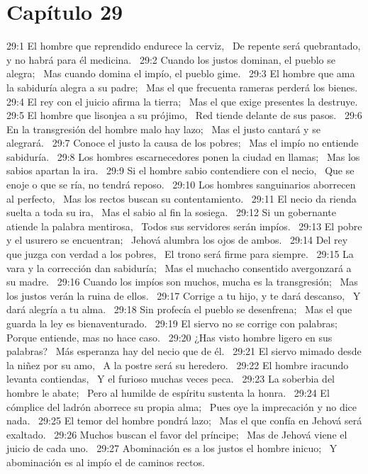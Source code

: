 \section*{Capítulo 29 }

29:1 El hombre que reprendido endurece la cerviz,  
De repente será quebrantado, y no habrá para él medicina.  
29:2 Cuando los justos dominan, el pueblo se alegra;  
Mas cuando domina el impío, el pueblo gime.  
29:3 El hombre que ama la sabiduría alegra a su padre;  
Mas el que frecuenta rameras perderá los bienes.  
29:4 El rey con el juicio afirma la tierra;  
Mas el que exige presentes la destruye.  
29:5 El hombre que lisonjea a su prójimo,  
Red tiende delante de sus pasos.  
29:6 En la transgresión del hombre malo hay lazo;  
Mas el justo cantará y se alegrará.  
29:7 Conoce el justo la causa de los pobres;  
Mas el impío no entiende sabiduría.  
29:8 Los hombres escarnecedores ponen la ciudad en llamas;  
Mas los sabios apartan la ira.  
29:9 Si el hombre sabio contendiere con el necio,  
Que se enoje o que se ría, no tendrá reposo.  
29:10 Los hombres sanguinarios aborrecen al perfecto,  
Mas los rectos buscan su contentamiento.  
29:11 El necio da rienda suelta a toda su ira,  
Mas el sabio al fin la sosiega.  
29:12 Si un gobernante atiende la palabra mentirosa,  
Todos sus servidores serán impíos.  
29:13 El pobre y el usurero se encuentran;  
Jehová alumbra los ojos de ambos.  
29:14 Del rey que juzga con verdad a los pobres,  
El trono será firme para siempre.  
29:15 La vara y la corrección dan sabiduría;  
Mas el muchacho consentido avergonzará a su madre.  
29:16 Cuando los impíos son muchos, mucha es la transgresión;  
Mas los justos verán la ruina de ellos.  
29:17 Corrige a tu hijo, y te dará descanso,  
Y dará alegría a tu alma.  
29:18 Sin profecía el pueblo se desenfrena;  
Mas el que guarda la ley es bienaventurado.  
29:19 El siervo no se corrige con palabras;  
Porque entiende, mas no hace caso.  
29:20 ¿Has visto hombre ligero en sus palabras?  
Más esperanza hay del necio que de él.  
29:21 El siervo mimado desde la niñez por su amo,  
A la postre será su heredero.  
29:22 El hombre iracundo levanta contiendas,  
Y el furioso muchas veces peca.  
29:23 La soberbia del hombre le abate;  
Pero al humilde de espíritu sustenta la honra.  
29:24 El cómplice del ladrón aborrece su propia alma;  
Pues oye la imprecación y no dice nada.  
29:25 El temor del hombre pondrá lazo;  
Mas el que confía en Jehová será exaltado.  
29:26 Muchos buscan el favor del príncipe;  
Mas de Jehová viene el juicio de cada uno.  
29:27 Abominación es a los justos el hombre inicuo;  
Y abominación es al impío el de caminos rectos. 
